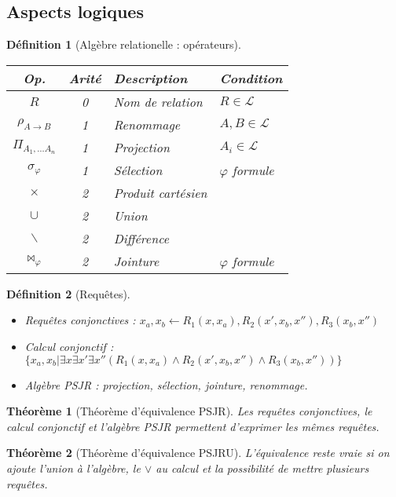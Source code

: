 \documentclass[landscape]{article}
\renewcommand{\L}{\mathscr{L}}
\newcommand{\1}{\mathbbm{1}}
\renewcommand{\phi}{\varphi}
\newtheorem{theo}{Théorème}
\newtheorem{defi}{Définition}
\begin{document}
\begin{multicols}{2}
    \section{Aspects logiques}

    \begin{defi}[Algèbre relationelle : opérateurs]
        \begin{tabular}{ccll}
            \hline
            Op. & Arité & Description & Condition \\
            \hline
            $R$ & 0 & Nom de relation & $R \in \L$ \\
            $\rho_{A\rightarrow B}$ & 1 & Renommage & $A,B\in\L$ \\
            $\Pi_{A_1,\ldots A_n}$ & 1 & Projection & $A_i\in\L$ \\
            $\sigma_\phi$ & 1 & Sélection & $\phi$ formule \\
            $\times$ & 2 & Produit cartésien & \\
            $\cup$ & 2 & Union & \\
            $\backslash$ & 2 & Différence & \\
            $\bowtie_\phi$ & 2 & Jointure & $\phi$ formule \\
            \hline
        \end{tabular}
    \end{defi}

    \begin{defi}[Requêtes] \begin{itemize}
        \item Requêtes conjonctives : $x_a, x_b \leftarrow R_1(x, x_a), R_2(x', x_b, x''), R_3(x_b, x'')$
        \item Calcul conjonctif : $\{x_a, x_b | \exists x \exists x' \exists x''(R_1(x, x_a)\wedge R_2(x', x_b, x'')\wedge R_3(x_b, x'')) \}$
        \item Algèbre PSJR : projection, sélection, jointure, renommage.
    \end{itemize}\end{defi}

    \begin{theo}[Théorème d'équivalence PSJR]
        Les requêtes conjonctives, le calcul conjonctif et l'algèbre PSJR permettent
        d'exprimer les mêmes requêtes.
    \end{theo}

    \begin{theo}[Théorème d'équivalence PSJRU]
        L'équivalence reste vraie si on ajoute l'union à l'algèbre, le $\vee$ au
        calcul et la possibilité de mettre plusieurs requêtes.
    \end{theo}


\end{multicols}
\end{document}
